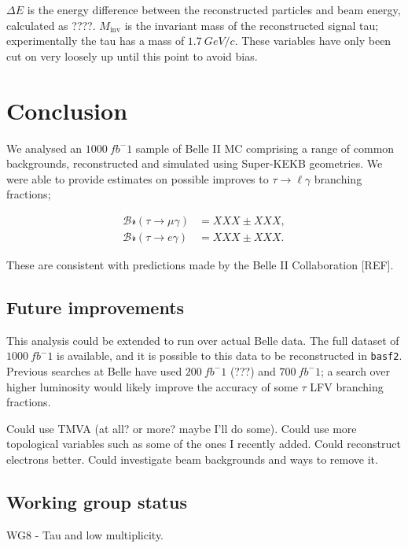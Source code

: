 \documentclass[12pt]{thesis}  %
\begin{document}
$\Delta E$ is the energy difference between the reconstructed particles and beam energy, calculated as ????. $M_{\text{inv}}$ is the invariant mass of the reconstructed signal tau; experimentally the tau has a mass of $\SI{1.7}{GeV/c}$. These variables have only been cut on very loosely up until this point to avoid bias.

\pagebreak


\chapter{Conclusion}

We analysed an $\SI{1000}{fb^-1}$ sample of Belle II MC comprising a range of common backgrounds, reconstructed and simulated using Super-KEKB geometries. We were able to provide estimates on possible improves to $\tau\to\ell\gamma$ branching fractions;

\begin{align}
\mathcal{Br}(\tau\to\mu\gamma) &= XXX \pm XXX,\\
\mathcal{Br}(\tau\to e\gamma) &= XXX \pm XXX.
\end{align}

These are consistent with predictions made by the Belle II Collaboration [REF].


\section{Future improvements}

This analysis could be extended to run over actual Belle data. The full dataset of $\SI{1000}{fb^-1}$ is available, and it is possible to this data to be reconstructed in \texttt{basf2}. Previous searches at Belle have used $\SI{200}{fb^-1}$ (???) and $\SI{700}{fb^-1}$; a search over higher luminosity would likely improve the accuracy of some $\tau$ LFV branching fractions.

Could use TMVA (at all? or more? maybe I'll do some). Could use more topological variables such as some of the ones I recently added. Could reconstruct electrons better. Could investigate beam backgrounds and ways to remove it.

\section{Working group status}

WG8 - Tau and low multiplicity.
\end{document}
